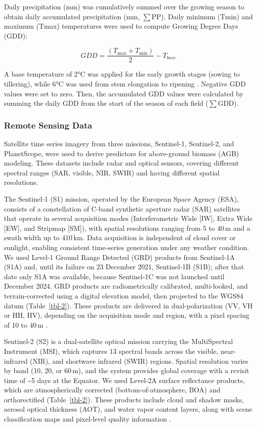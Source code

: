 \documentclass[
  english,
  review,
  number,
  sort,compress,
  authoryear,
  3p]{elsarticle}
\begin{document}
Daily precipitation (mm) was cumulatively summed over the growing season
to obtain daily accumulated precipitation (mm, \(\sum\)PP). Daily
minimum (Tmin) and maximum (Tmax) temperatures were used to compute
Growing Degree Days (GDD):

\[GDD  =  \frac{\left( T_{\max} + T_{\min} \right)}{2} - T_{base}\]

A base temperature of 2°C was applied for the early growth stages
(sowing to tillering), while 6°C was used from stem elongation to
ripening \citep{DelPozo1987}. Negative GDD values were set to zero.
Then, the accumulated GDD values were calculated by summing the daily
GDD from the start of the season of each field (\(\sum\)GDD).

\subsubsection{Remote Sensing Data}\label{remote-sensing-data}

Satellite time series imagery from three missions, Sentinel-1,
Sentinel-2, and PlanetScope, were used to derive predictors for
above-ground biomass (AGB) modeling. These datasets include radar and
optical sensors, covering different spectral ranges (SAR, visible, NIR,
SWIR) and having different spatial resolutions.

The Sentinel‑1 (S1) mission, operated by the European Space Agency
(ESA), consists of a constellation of C-band synthetic aperture radar
(SAR) satellites that operate in several acquisition modes
(Interferometric Wide {[}IW{]}, Extra Wide {[}EW{]}, and Stripmap
{[}SM{]}), with spatial resolutions ranging from 5 to 40\,m and a swath
width up to 410\,km. Data acquisition is independent of cloud cover or
sunlight, enabling consistent time-series generation under any weather
condition. We used Level‑1 Ground Range Detected (GRD) products from
Sentinel‑1A (S1A) and, until its failure on 23 December 2021,
Sentinel‑1B (S1B); after that date only S1A was available, because
Sentinel‑1C was not launched until December 2024. GRD products are
radiometrically calibrated, multi-looked, and terrain-corrected using a
digital elevation model, then projected to the WGS84 datum
(Table~\ref{tbl-2}). These products are delivered in dual-polarization
(VV, VH or HH, HV), depending on the acquisition mode and region, with a
pixel spacing of 10 to 40\,m \citep{Torres2012}.

Sentinel‑2 (S2) is a dual-satellite optical mission carrying the
MultiSpectral Instrument (MSI), which captures 13 spectral bands across
the visible, near-infrared (NIR), and shortwave infrared (SWIR) regions.
Spatial resolution varies by band (10, 20, or 60\,m), and the system
provides global coverage with a revisit time of \textasciitilde5 days at
the Equator. We used Level‑2A surface reflectance products, which are
atmospherically corrected (bottom-of-atmosphere, BOA) and orthorectified
(Table~\ref{tbl-2}). These products include cloud and shadow masks,
aerosol optical thickness (AOT), and water vapor content layers, along
with scene classification maps and pixel-level quality information
\citep{Drusch2012}.
\end{document}
